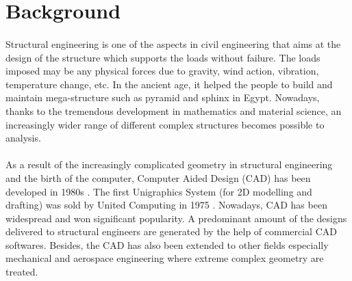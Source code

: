 \section{Background}
\paragraph{}
Structural engineering is one of the aspects in civil engineering that aims at the design of the structure which supports the loads without failure.
The loads imposed may be any physical forces due to gravity, wind action, vibration, temperature change, etc.
In the ancient age, it helped the people to build and maintain mega-structure such as pyramid and sphinx in Egypt.
Nowadays, thanks to the tremendous development in mathematics and material science, an increasingly wider range of different complex structures becomes possible to analysis.

\paragraph{}
As a result of the increasingly complicated geometry in structural engineering and the birth of the computer, Computer Aided Design (CAD) has been developed in 1980s \citep{Dav2008}.
The first Unigraphics System (for 2D modelling and drafting) was sold by United Computing in 1975 \citep{Ste2010}.
Nowadays, CAD has been widespread and won significant popularity.
A predominant amount of the designs delivered to structural engineers are generated by the help of commercial CAD softwares.
Besides, the CAD has also been extended to other fields especially mechanical and aerospace engineering where extreme complex geometry are treated.

